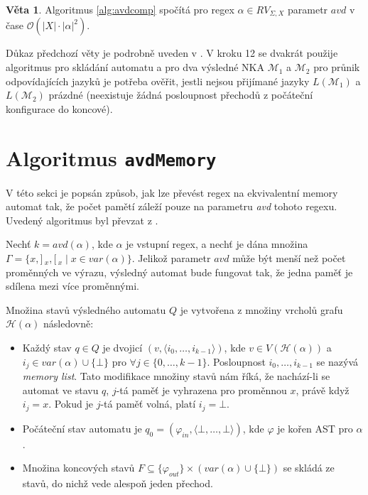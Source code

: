 \documentclass[thesis=B,czech]{FITthesis}[2019/12/23]
\theoremstyle{definition}
\newtheorem{theorem}{Věta}[chapter]
\begin{document}
\begin{theorem}\label{avdcomp}Algoritmus \ref{alg:avdcomp} spočítá pro regex $\alpha \in RV_{\Sigma, X}$ parametr $avd$ v čase $\mathcal{O}(|X|\cdot|\alpha|^2)$. \cite{schmidref}
\end{theorem}
Důkaz předchozí věty je podrobně uveden v \cite[s. 7]{schmidref}. V kroku 12 se dvakrát použije algoritmus pro skládání automatu \cite[s. 54--56]{sestakova} a pro dva výsledné NKA $\mathcal{M}_1$ a $\mathcal{M}_2$ pro průnik odpovídajících jazyků je potřeba ověřit, jestli nejsou přijímané jazyky $L(\mathcal{M}_1)$ a $L(\mathcal{M}_2)$ prázdné (neexistuje žádná posloupnost přechodů z počáteční konfigurace do koncové).

\section{Algoritmus \texttt{avdMemory}}

V této sekci je popsán způsob, jak lze převést regex na ekvivalentní memory automat tak, že počet pamětí záleží pouze na parametru \emph{avd} tohoto regexu. 
Uvedený algoritmus byl převzat z \cite[kapitola 3]{schmidref}.

Nechť $k=avd(\alpha)$, kde $\alpha$ je vstupní regex, a nechť je dána množina $\Gamma = \{x, ]\,_x, [\,_x \mid x \in var(\alpha)\}$. Jelikož parametr $avd$ může být menší než počet proměnných ve výrazu, výsledný automat bude fungovat tak, že jedna paměť je sdílena mezi více proměnnými. 

Množina stavů výsledného automatu $Q$ je vytvořena z množiny vrcholů grafu $\mathcal{H}(\alpha)$ následovně:
\begin{itemize}
	\item Každý stav $q \in Q$ je dvojicí $(v, \langle i_0, \dots, i_{k-1}  \rangle)$, kde $v \in V(\mathcal{H}(\alpha))$ a ${i_j \in var(\alpha) \cup \{\bot\}}$ pro $\forall j \in \{0, \dots, k-1\}$. Posloupnost $ i_0, \dots, i_{k-1}$ se nazývá \emph{memory list}. Tato modifikace množiny stavů nám říká, že nachází-li se automat ve stavu $q$, $j$-tá paměť je vyhrazena pro proměnnou $x$, právě když $i_j = x$. Pokud je $j$-tá paměť volná, platí $i_j = \bot$.
	\item Počáteční stav automatu je $q_0 = (\varphi_{in}, \langle \bot, \dots, \bot \rangle)$, kde $\varphi$ je kořen AST pro $\alpha$.
	\item Množina koncových stavů $F \subseteq \{\varphi_{out}\} \times (var(\alpha) \cup \{\bot\})$ se skládá ze stavů, do nichž vede alespoň jeden přechod. 
\end{itemize}
\end{document}
